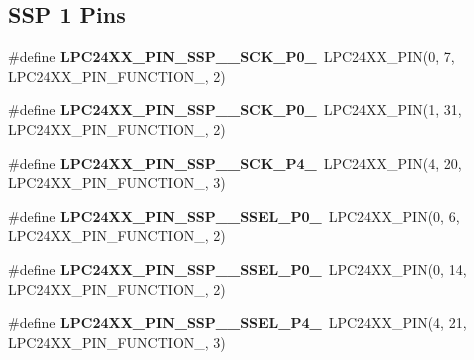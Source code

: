 \subsection*{S\+SP 1 Pins}
\begin{DoxyCompactItemize}
\item 
\mbox{\label{group__lpc24xx__io_gaa75f7b5fe27d770957a43bea35ebee04}} 
\#define {\bfseries L\+P\+C24\+X\+X\+\_\+\+P\+I\+N\+\_\+\+S\+S\+P\+\_\+\_\+\+S\+C\+K\+\_\+\+P0\+\_}~L\+P\+C24\+X\+X\+\_\+\+P\+IN(0, 7, L\+P\+C24\+X\+X\+\_\+\+P\+I\+N\+\_\+\+F\+U\+N\+C\+T\+I\+O\+N\+\_, 2)
\item 
\mbox{\label{group__lpc24xx__io_ga9a7c9def3c537fe1c33783d4f1e4eb54}} 
\#define {\bfseries L\+P\+C24\+X\+X\+\_\+\+P\+I\+N\+\_\+\+S\+S\+P\+\_\+\_\+\+S\+C\+K\+\_\+\+P0\+\_}~L\+P\+C24\+X\+X\+\_\+\+P\+IN(1, 31, L\+P\+C24\+X\+X\+\_\+\+P\+I\+N\+\_\+\+F\+U\+N\+C\+T\+I\+O\+N\+\_, 2)
\item 
\mbox{\label{group__lpc24xx__io_ga7d6825f697224c9ba17c63fca664c9e2}} 
\#define {\bfseries L\+P\+C24\+X\+X\+\_\+\+P\+I\+N\+\_\+\+S\+S\+P\+\_\+\_\+\+S\+C\+K\+\_\+\+P4\+\_}~L\+P\+C24\+X\+X\+\_\+\+P\+IN(4, 20, L\+P\+C24\+X\+X\+\_\+\+P\+I\+N\+\_\+\+F\+U\+N\+C\+T\+I\+O\+N\+\_, 3)
\item 
\mbox{\label{group__lpc24xx__io_ga7f964bd8b163bf3818ce4bab5c05d39f}} 
\#define {\bfseries L\+P\+C24\+X\+X\+\_\+\+P\+I\+N\+\_\+\+S\+S\+P\+\_\+\_\+\+S\+S\+E\+L\+\_\+\+P0\+\_}~L\+P\+C24\+X\+X\+\_\+\+P\+IN(0, 6, L\+P\+C24\+X\+X\+\_\+\+P\+I\+N\+\_\+\+F\+U\+N\+C\+T\+I\+O\+N\+\_, 2)
\item 
\mbox{\label{group__lpc24xx__io_ga24950ed8447828d897e897f36e574349}} 
\#define {\bfseries L\+P\+C24\+X\+X\+\_\+\+P\+I\+N\+\_\+\+S\+S\+P\+\_\+\_\+\+S\+S\+E\+L\+\_\+\+P0\+\_}~L\+P\+C24\+X\+X\+\_\+\+P\+IN(0, 14, L\+P\+C24\+X\+X\+\_\+\+P\+I\+N\+\_\+\+F\+U\+N\+C\+T\+I\+O\+N\+\_, 2)
\item 
\mbox{\label{group__lpc24xx__io_ga3929cd7375839261762d2ac4e4bc1e50}} 
\#define {\bfseries L\+P\+C24\+X\+X\+\_\+\+P\+I\+N\+\_\+\+S\+S\+P\+\_\+\_\+\+S\+S\+E\+L\+\_\+\+P4\+\_}~L\+P\+C24\+X\+X\+\_\+\+P\+IN(4, 21, L\+P\+C24\+X\+X\+\_\+\+P\+I\+N\+\_\+\+F\+U\+N\+C\+T\+I\+O\+N\+\_, 3)

\end{DoxyCompactItemize}
